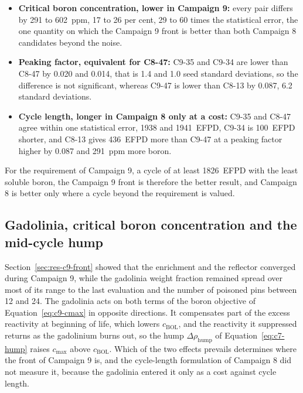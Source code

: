 \begin{itemize}
  \item \textbf{Critical boron concentration, lower in Campaign 9:}
        every pair differs by 291 to \SI{602}{ppm}, 17 to 26 per cent,
        29 to 60 times the statistical error, the one quantity on which
        the Campaign 9 front is better than both Campaign 8 candidates
        beyond the noise.
  \item \textbf{Peaking factor, equivalent for C8-47:} C9-35 and C9-34
        are lower than C8-47 by 0.020 and 0.014, that is 1.4 and 1.0
        seed standard deviations, so the difference is not significant,
        whereas C9-47 is lower than C8-13 by 0.087, 6.2 standard
        deviations.
  \item \textbf{Cycle length, longer in Campaign 8 only at a cost:}
        C9-35 and C8-47 agree within one statistical error, 1938 and
        \SI{1941}{EFPD}, C9-34 is \SI{100}{EFPD} shorter, and C8-13
        gives \SI{436}{EFPD} more than C9-47 at a peaking factor higher
        by 0.087 and \SI{291}{ppm} more boron.
\end{itemize}

For the requirement of Campaign 9, a cycle of at least \SI{1826}{EFPD}
with the least soluble boron, the Campaign 9 front is therefore the
better result, and Campaign 8 is better only where a cycle beyond the
requirement is valued.

\subsection{Gadolinia, critical boron concentration and the mid-cycle hump}
\label{sec:res-c9-gd}

Section~\ref{sec:res-c9-front} showed that the enrichment and the
reflector converged during Campaign 9, while the gadolinia weight
fraction remained spread over most of its range to the last evaluation
and the number of poisoned pins between 12 and 24. The gadolinia acts
on both terms of the boron objective of Equation~\eqref{eq:c9-cmax} in
opposite directions. It compensates part of the excess reactivity at
beginning of life, which lowers $c_\mathrm{BOL}$, and the reactivity it
suppressed returns as the gadolinium burns out, so the hump
$\Delta\rho_\mathrm{hump}$ of Equation~\eqref{eq:c7-hump} raises
$c_\mathrm{max}$ above $c_\mathrm{BOL}$. Which of the two effects
prevails determines where the front of Campaign 9 is, and the
cycle-length formulation of Campaign 8 did not measure it, because the
gadolinia entered it only as a cost against cycle length.

